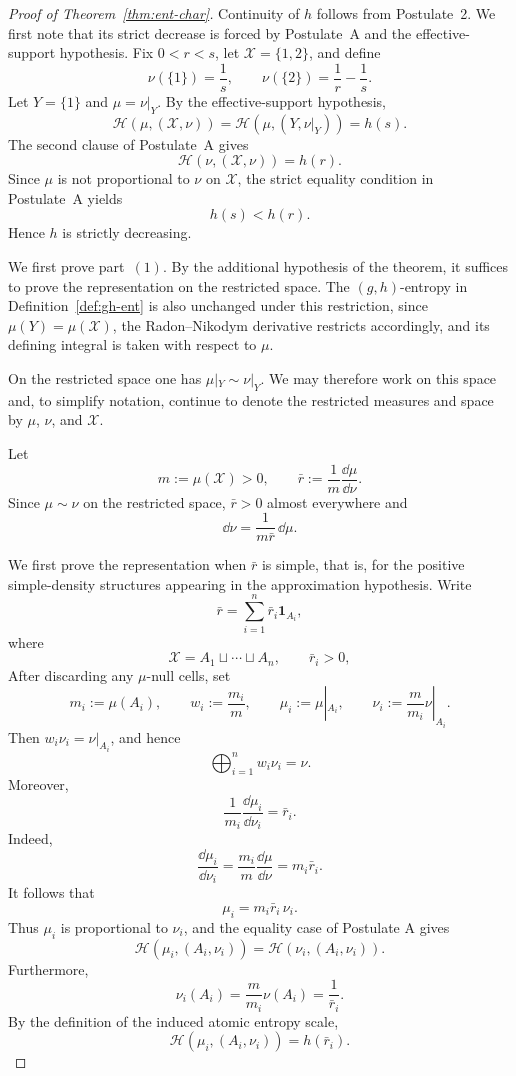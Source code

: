 \documentclass[reqno]{amsart}
\begin{document}



\begin{proof}[Proof of Theorem~\ref{thm:ent-char}]

Continuity of $h$ follows from Postulate~2. We first note that its strict
decrease is forced by Postulate~A and the effective-support hypothesis.
Fix $0<r<s$, let $\mathcal X=\{1,2\}$, and define
$$
\nu(\{1\})=\frac1s,
\qquad
\nu(\{2\})=\frac1r-\frac1s.
$$
Let $Y=\{1\}$ and $\mu=\nu|_Y$. By the effective-support hypothesis,
$$
\mathcal H(\mu,(\mathcal X,\nu))
=
\mathcal H(\mu,(Y,\nu|_Y))
=
h(s).
$$
The second clause of Postulate~A gives
$$
\mathcal H(\nu,(\mathcal X,\nu))=h(r).
$$
Since $\mu$ is not proportional to $\nu$ on $\mathcal{X}$, the strict
equality condition in Postulate~A yields
$$
h(s)<h(r).
$$
Hence $h$ is strictly decreasing.

We first prove part~$(1)$. By the additional hypothesis of the theorem, it suffices to prove the representation on the restricted space. The $(g,h)$-entropy in Definition~\ref{def:gh-ent} is also unchanged under this restriction, since $\mu(Y)=\mu(\mathcal X)$, the Radon--Nikodym derivative restricts accordingly, and its defining integral is taken with respect to $\mu$.

On the restricted space one has $\mu|_Y\sim\nu|_Y$. We may therefore work on this space and, to simplify notation, continue to denote the restricted measures and space by $\mu$, $\nu$, and $\mathcal X$.


Let
$$
m:=\mu(\mathcal X)>0,
\qquad
\bar{r}
:=
\frac{1}{m}\frac{\dd\mu}{\dd\nu}.
$$
Since $\mu\sim\nu$ on the restricted space, $\bar r>0$ almost
everywhere and
$$
\dd\nu=\frac{1}{m\bar r}\,\dd\mu.
$$

We first prove the representation when $\bar r$ is simple, that is, for the positive simple-density structures appearing in the approximation hypothesis.
Write
$$
\bar r
=
\sum_{i=1}^n \bar r_i\mathbf 1_{A_i},
$$ 
where
$$
\mathcal X=A_1\sqcup\cdots\sqcup A_n,
\qquad
\bar r_i>0,
$$
After discarding any $\mu$-null cells, set
$$
m_i:=\mu(A_i),
\qquad
w_i:=\frac{m_i}{m},
\qquad
\mu_i:=\mu|_{A_i},
\qquad
\nu_i:=\frac{m}{m_i}\nu|_{A_i}.
$$
Then $w_i\nu_i=\nu|_{A_i}$,
and hence
$$
\bigoplus_{i=1}^n w_i\nu_i=\nu.
$$
Moreover,
$$
\frac{1}{m_i}\frac{\dd\mu_i}{\dd\nu_i}
=
\bar r_i.
$$
Indeed,
$$
\frac{\dd\mu_i}{\dd\nu_i}
=
\frac{m_i}{m}\frac{\dd\mu}{\dd\nu}
=
m_i\bar r_i.
$$
It follows that
$$
\mu_i=m_i\bar r_i\,\nu_i.
$$
Thus $\mu_i$ is proportional to $\nu_i$, and the equality case of
Postulate A gives
$$
\mathcal H(\mu_i,(A_i,\nu_i))
=
\mathcal H(\nu_i,(A_i,\nu_i)).
$$
Furthermore,
$$
\nu_i(A_i)
=
\frac{m}{m_i}\nu(A_i)
=
\frac{1}{\bar r_i}.
$$
By the definition of the induced atomic entropy scale,
$$
\mathcal H(\mu_i,(A_i,\nu_i))
=
h(\bar r_i).
$$


\end{proof}
\end{document}

